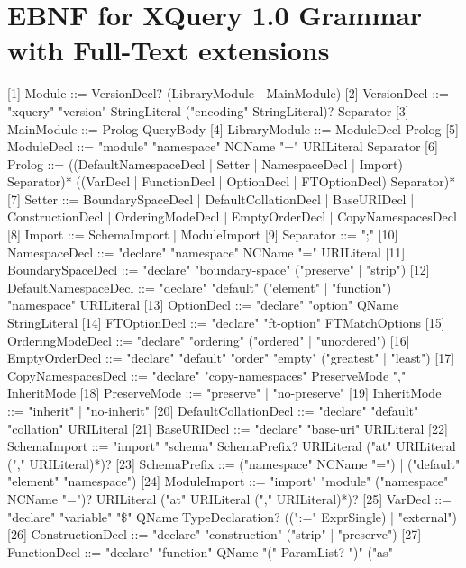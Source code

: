 \chapter{EBNF for XQuery 1.0 Grammar with Full-Text extensions}

[1]   	Module ::= VersionDecl? (LibraryModule | MainModule)
[2]   	VersionDecl ::= "xquery" "version" StringLiteral 
                        ("encoding" StringLiteral)? Separator
[3]     MainModule ::= Prolog QueryBody
[4]   	LibraryModule ::= ModuleDecl Prolog
[5]   	ModuleDecl ::= "module" "namespace" NCName "=" URILiteral Separator
[6]   	Prolog ::= ((DefaultNamespaceDecl | Setter | NamespaceDecl | Import)
                   Separator)* ((VarDecl | FunctionDecl | OptionDecl |
                   FTOptionDecl) Separator)*
[7]   	Setter ::= BoundarySpaceDecl | DefaultCollationDecl | BaseURIDecl |
                   ConstructionDecl | OrderingModeDecl | EmptyOrderDecl |
                   CopyNamespacesDecl 
[8]   	Import ::= SchemaImport | ModuleImport 
[9]   	Separator ::= ";"
[10]   	NamespaceDecl ::= "declare" "namespace" NCName "=" URILiteral
[11]   	BoundarySpaceDecl ::= "declare" "boundary-space" ("preserve" | "strip")
[12]   	DefaultNamespaceDecl ::= "declare" "default" ("element" | "function")
                                 "namespace" URILiteral
[13]   	OptionDecl ::= "declare" "option" QName StringLiteral
[14]   	FTOptionDecl ::= "declare" "ft-option" FTMatchOptions
[15]   	OrderingModeDecl ::= "declare" "ordering" ("ordered" | "unordered")
[16]   	EmptyOrderDecl ::= "declare" "default" "order" "empty" ("greatest" |
                           "least")
[17]   	CopyNamespacesDecl ::= "declare" "copy-namespaces" PreserveMode ","
                               InheritMode 
[18]   	PreserveMode ::= "preserve" | "no-preserve" 
[19]   	InheritMode ::= "inherit" | "no-inherit"
[20]   	DefaultCollationDecl ::= "declare" "default" "collation" URILiteral
[21]   	BaseURIDecl ::= "declare" "base-uri" URILiteral
[22]   	SchemaImport ::= "import" "schema" SchemaPrefix? URILiteral ("at"
                         URILiteral ("," URILiteral)*)?
[23]   	SchemaPrefix ::= ("namespace" NCName "=") | ("default" "element"
                         "namespace")
[24]   	ModuleImport ::= "import" "module" ("namespace" NCName "=")?
                         URILiteral ("at" URILiteral ("," URILiteral)*)?
[25]   	VarDecl ::= "declare" "variable" "\$" QName TypeDeclaration? ((":="
                    ExprSingle) | "external")
[26]   	ConstructionDecl ::= "declare" "construction" ("strip" | "preserve")
[27]   	FunctionDecl ::= "declare" "function" QName "(" ParamList? ")" ("as"
